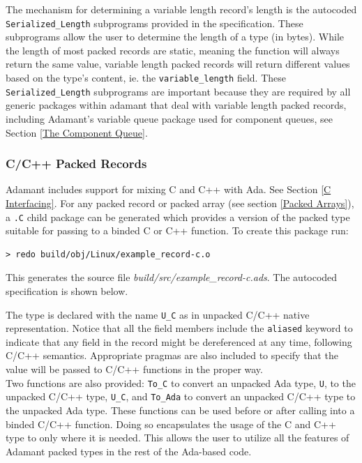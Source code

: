 The mechanism for determining a variable length record's length is the autocoded \texttt{Serialized\_Length} subprograms provided in the specification. These subprograms allow the user to determine the length of a type (in bytes). While the length of most packed records are static, meaning the function will always return the same value, variable length packed records will return different values based on the type's content, ie. the \texttt{variable\_length} field. These \texttt{Serialized\_Length} subprograms are important because they are required by all generic packages within adamant that deal with variable length packed records, including Adamant's variable queue package used for component queues, see Section \ref{The Component Queue}.

\subsubsection{C/C++ Packed Records} \label{C Packed Records}

Adamant includes support for mixing C and C++ with Ada. See Section \ref{C Interfacing}. For any packed record or packed array (see section \ref{Packed Arrays}), a \texttt{.C} child package can be generated which provides a version of the packed type suitable for passing to a binded C or C++ function. To create this package run:

\vspace{5mm} %
\begin{verbatim}
> redo build/obj/Linux/example_record-c.o
\end{verbatim}
\vspace{5mm} %

This generates the source file \textit{build/src/example\_record-c.ads}. The autocoded specification is shown below.


The type is declared with the name \texttt{U\_C} as in unpacked C/C++ native representation. Notice that all the field members include the \texttt{aliased} keyword to indicate that any field in the record might be dereferenced at any time, following C/C++ semantics. Appropriate pragmas are also included to specify that the value will be passed to C/C++ functions in the proper way. \\

Two functions are also provided: \texttt{To\_C} to convert an unpacked Ada type, \texttt{U}, to the unpacked C/C++ type, \texttt{U\_C}, and \texttt{To\_Ada} to convert an unpacked C/C++ type to the unpacked Ada type. These functions can be used before or after calling into a binded C/C++ function. Doing so encapsulates the usage of the C and C++ type to only where it is needed. This allows the user to utilize all the features of Adamant packed types in the rest of the Ada-based code.

